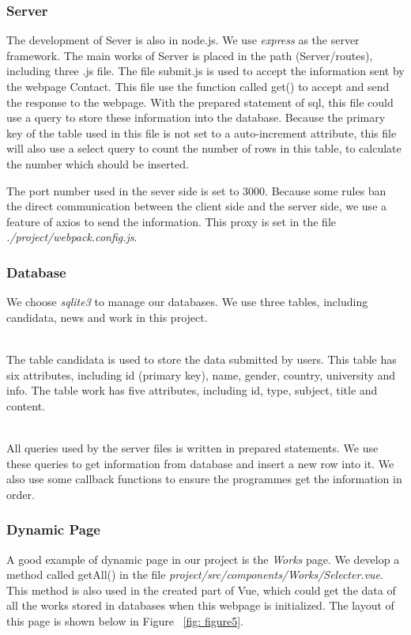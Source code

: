 \documentclass{article}
\begin{document}
\subsubsection{Server}
The development of Sever is also in node.js. We use \textit{express} as the 
server framework. The main works of Server is placed in the path (Server/routes),
including three .js file. The file submit.js is used to accept the information 
sent by the webpage Contact. This file use the function called get() to accept and 
send the response to the webpage. With the prepared statement of sql, this file 
could use a query to store these information into the database. Because the primary
key of the table used in this file is not set to a auto-increment attribute, this
file will also use a select query to count the number of rows in this table, to 
calculate the number which should be inserted.

The port number used in the sever side is set to 3000. Because some rules ban the 
direct communication between the client side and the server side, we use a feature
of axios to send the information. This proxy is set in the file
\textit{./project/webpack.config.js}.
\subsubsection{Database}
We choose \textit{sqlite3} to manage our databases. 
We use three tables, including candidata, news and work in this project.

~\\
\noindent
The table candidata is used to store the data submitted by users. This table
has six attributes, including id (primary key), name, gender, country, university
and info. The table work has five attributes, including id, type, subject, title 
and content.

~\\
\noindent
All queries used by the server files is written in prepared statements. We use
these queries to get information from database and insert a new row into it. We
also use some callback functions to ensure the programmes get the information 
in order.



\subsubsection{Dynamic Page}
A good example of dynamic page in our project is the \textit{Works} page.
We develop a method called getAll() in the file
\textit{project/src/components/Works/Selecter.vue}. This method is also used in the 
created part of Vue, which could get the data of all the works stored in databases
when this webpage is initialized. The layout of this page is shown below in 
Figure ~\ref{fig: figure5}.
\end{document}
